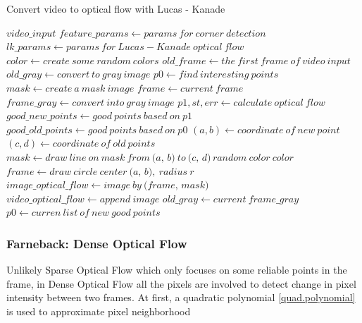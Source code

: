 \documentclass[a4paper, 12pt]{article}
\begin{document}
\begin{algorithm}[H]
    \caption{Convert video to optical flow with Lucas - Kanade}
    \begin{algorithmic}[1]
        \Require $video\_input$
        \State $feature\_params \gets params \ for \ corner \ detection$
        \State $lk\_params \gets params \ for \ Lucas - Kanade \ optical \ flow$
        \State $color \gets create \ some \ random \ colors$
        \State $old\_frame \gets the \ first \ frame \ of \ video \ input $
        \State $old\_gray \gets convert \ to \ gray \ image$
        \State $p0 \gets find \ interesting \ points$ 
        \State $mask \gets create \ a \ mask \ image$
            \State $frame \gets current \ frame$
            \State $frame\_gray \gets convert \ into \ gray \ image$
            \State $p1, st, err \gets calculate \ optical \ flow $ 
            \State $good\_new\_points \gets good \ points \ based \ on \ p1$
            \State $good\_old\_points \gets good \ points \ based \ on \ p0$
                \State $(a, b) \gets coordinate \ of \ new \ point$
                \State $(c, d) \gets coordinate \ of \ old \ points$
                \State $mask \gets draw \ line \ on \ \textit{mask} \ from \ \textit{(a, b)} \ to \ \textit{(c, d)} \, random \ color \ \textit{color}$
                \State $frame \gets draw \ circle \ center \ \textit{(a, b)}, \ radius \ \textit{r}$
            \EndFor
            \State $image\_optical\_flow \gets image \ by \ \textit{(frame, mask)}$
            \State $video\_optical\_flow \gets append \ \textit{image}$
            \State $old\_gray \gets current \ frame\_gray$
            \State $p0 \gets curren \ list \ of \ new \ good \ points$
        \EndWhile
    \end{algorithmic}
\end{algorithm}

\newpage

\subsubsection{Farneback: Dense Optical Flow}
Unlikely Sparse Optical Flow which only focuses on some reliable points in the frame, in Dense Optical Flow all the pixels are involved to detect change in pixel intensity between two frames. At first, a quadratic polynomial \ref{quad.polynomial} is used to approximate pixel neighborhood
\end{document}
